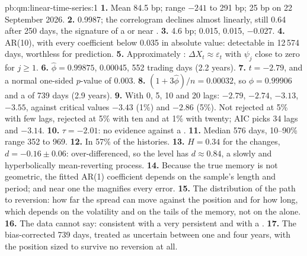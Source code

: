 \begin{solution}{pb:qm:linear-time-series:1}
\textbf{1.} Mean 84.5 bp; range $-241$ to 291 bp; 25 bp on 22 September 2026.
\textbf{2.} 0.9987; the correlogram declines almost linearly, still 0.64 after 250 days, the signature of a  or near .
\textbf{3.} 4.6 bp; 0.015, 0.015, $-0.027$.
\textbf{4.} AR(10), with every coefficient below 0.035 in absolute value: detectable in 12\,574 days, worthless for prediction.
\textbf{5.} Approximately : $\Delta X_t \approx \varepsilon_t$ with $\psi_j$ close to zero for $j \ge 1$.
\textbf{6.} $\hat\phi = 0.99875$,  0.00045,  552 trading days (2.2 years).
\textbf{7.} $t = -2.79$, and a normal one-sided $p$-value of 0.003.
\textbf{8.} $(1 + 3\hat\phi)/n = 0.00032$, so $\phi = 0.99906$ and a  of 739 days (2.9 years).
\textbf{9.} With 0, 5, 10 and 20 lags: $-2.79$, $-2.74$, $-3.13$, $-3.55$, against critical values $-3.43$ (1\%) and $-2.86$ (5\%). Not rejected at 5\% with
few lags, rejected at 5\% with ten and at 1\% with twenty; AIC picks 34 lags and $-3.14$.
\textbf{10.} $\tau = -2.01$: no evidence against a .
\textbf{11.} Median 576 days, 10--90\% range 352 to 969.
\textbf{12.} In 57\% of the histories.
\textbf{13.} $H = 0.34$ for the changes, $d = -0.16 \pm 0.06$: over-differenced, so the level has $d \approx 0.84$, a slowly and hyperbolically mean-reverting
process.
\textbf{14.} Because the true memory is not geometric, the fitted AR(1) coefficient depends on the sample's length and period; and near one the 
magnifies every error.
\textbf{15.} The distribution of the path to reversion: how far the spread can move against the position and for how long, which depends on the volatility
and on the tails of the memory, not on the  alone.
\textbf{16.} The data cannot say: consistent with a very persistent  and with a .
\textbf{17.} The bias-corrected 739 days, treated as uncertain between one and four years, with the position sized to survive no reversion at all.

\end{solution}

